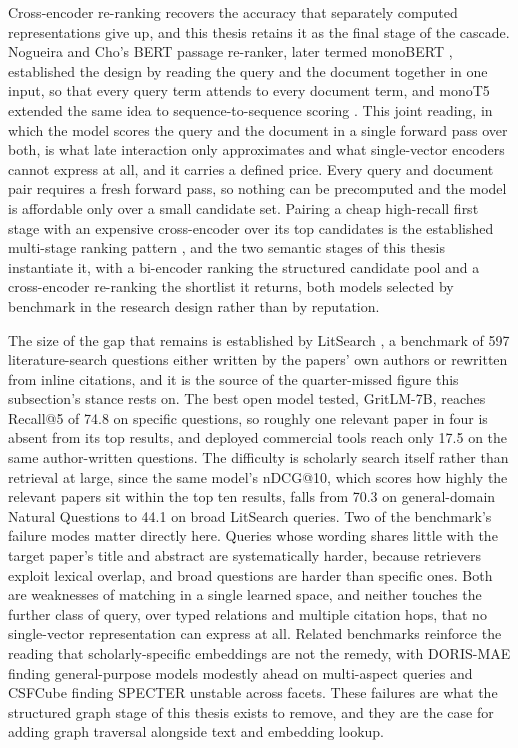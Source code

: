 Cross-encoder re-ranking recovers the accuracy that separately computed
representations give up, and this thesis retains it as the final stage
of the cascade.  Nogueira and Cho's BERT passage re-ranker, later
termed monoBERT \cite{nogueira2019monobert}, established the design by
reading the query and the document together in one input, so that every
query term attends to every document term, and monoT5 extended the same
idea to sequence-to-sequence scoring \cite{nogueira2020monot5}.  This
joint reading, in which the model scores the query and the document in
a single forward pass over both, is what late interaction only
approximates and what single-vector encoders cannot express at all,
and it carries a defined price.  Every query and document pair
requires a fresh forward pass, so
nothing can be precomputed and the model is affordable only over a
small candidate set.  Pairing a cheap high-recall first stage with an
expensive cross-encoder over its top candidates is the established
multi-stage ranking pattern \cite{nogueira2019multistage}, and the two
semantic stages of this thesis instantiate it, with a bi-encoder
ranking the structured candidate pool and a cross-encoder re-ranking
the shortlist it returns, both models selected by benchmark in the
research design rather than by reputation.

The size of the gap that remains is established by LitSearch
\cite{ajith2024litsearch}, a benchmark of 597 literature-search
questions either written by the papers' own authors or rewritten from
inline citations, and it is the source of the quarter-missed figure
this subsection's stance rests on.  The best open model tested,
GritLM-7B, reaches Recall@5 of 74.8 on specific questions, so roughly
one relevant paper in four is absent from its top results, and deployed
commercial tools reach only 17.5 on the same author-written questions.
The difficulty is scholarly search itself rather than retrieval at
large, since the same model's nDCG@10, which scores how highly the
relevant papers sit within the top ten results, falls from 70.3 on
general-domain Natural Questions to 44.1 on broad LitSearch queries.
Two of the benchmark's failure modes matter directly here.  Queries
whose wording shares little with the target paper's title and abstract
are systematically harder, because retrievers exploit lexical overlap,
and broad questions are harder than specific ones.  Both are weaknesses
of matching in a single learned space, and neither touches the further
class of query, over typed relations and multiple citation hops, that
no single-vector representation can express at all.  Related benchmarks
reinforce the reading that scholarly-specific embeddings are not the
remedy, with DORIS-MAE \cite{wang2023dorismae} finding general-purpose
models modestly ahead on multi-aspect queries and CSFCube
\cite{mysore2021csfcube} finding SPECTER unstable across facets.  These
failures are what the structured graph stage of this thesis exists to
remove, and they are the case for adding graph traversal alongside text
and embedding lookup.

